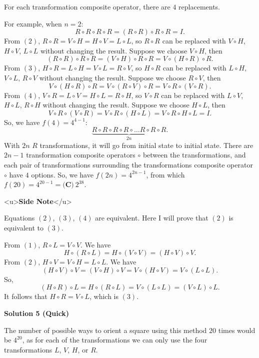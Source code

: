 \begin{enumerate}
 For each transformation composite operator, there are $4$ replacements. 

 For example, when $n = 2$:
 \[R \circ R \circ R \circ R = (R \circ R) \circ R \circ R = I.\]From $(2)$, $R \circ R = V \circ H = H \circ V = L \circ L$, so $R \circ R$ can be replaced with $V \circ H$, $H \circ V$, $L \circ L$ without changing the result. Suppose we choose $V \circ H$, then 
 \[(R \circ R) \circ R \circ R = (V \circ H) \circ R \circ R = V \circ (H \circ R) \circ R.\]From $(3)$, $H \circ R = L \circ H = V \circ L = R \circ V$, so $H \circ R$ can be replaced with $L \circ H$, $V \circ L$, $R \circ V$ without changing the result. Suppose we choose $R \circ V$, then 
 \[V \circ (H \circ R) \circ R = V \circ (R \circ V) \circ R = V \circ R \circ (V \circ R).\]From $(4)$, $V \circ R = L \circ V = H \circ L = R \circ H$, so $V \circ R$ can be replaced with $L \circ V$, $H \circ L$, $R \circ H$ without changing the result. Suppose we choose $H \circ L$, then 
 \[V \circ R \circ (V \circ R) =V \circ R \circ (H \circ L) = V \circ R \circ H \circ L = I.\]So, we have $f(4) = 4^{4-1}$:
 \[\underbrace{R \circ R \circ R \circ R \circ \dots R \circ R \circ R}_{2n}.\]With $2n$ $R$ transformations, it will go from initial state to initial state. There are $2n-1$ transformation composite operators $\circ$ between the transformations, and each pair of transformations surrounding the transformations composite operator $\circ$ have $4$ options. So, we have $f(2n) = 4^{2n-1}$, from which $f(20) = 4^{20-1} = \boxed{\textbf{(C)}\ 2^{38}}$.

 <u>\textbf{Side Note}</u>

 Equations $(2)$, $(3)$, $(4)$ are equivalent. Here I will prove that $(2)$ is equivalent to $(3)$.

 From $(1)$, $R \circ L = V \circ V$. We have
 \[H \circ (R \circ L) = H \circ (V \circ V) = (H \circ V) \circ V.\]From $(2)$, $H \circ V = V \circ H = L \circ L$. We have
 \[(H \circ V) \circ V = (V \circ H) \circ V = V \circ (H \circ V) = V \circ (L \circ L).\]So, 
 \[(H \circ R) \circ L = H \circ (R \circ L) = V \circ (L \circ L) = (V \circ L) \circ L.\]It follows that $H \circ R = V \circ L$, which is $(3)$.

 


 



\textbf{Solution 5 (Quick)}

The number of possible ways to orient a square using this method $20$ times would be $4^{20}$, as for each of the transformations we can only use the four transformations $L$, $V$, $H$, or $R$.


\end{enumerate}

